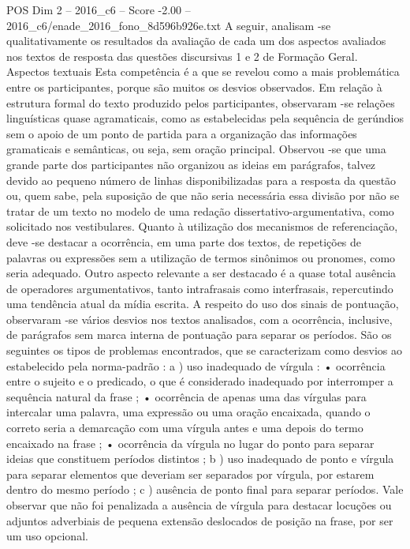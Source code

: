 \begin{textsample}{POS Dim 2 – 2016\_c6 – Score -2.00 – 2016\_c6/enade\_2016\_fono\_8d596b926e.txt}
A seguir, analisam -se qualitativamente os resultados da avaliação de cada um dos aspectos avaliados nos textos de resposta das questões discursivas 1 e 2 de Formação Geral.
Aspectos textuais Esta competência é a que se revelou como a mais problemática entre os participantes, porque são muitos os desvios observados.
Em relação à estrutura formal do texto produzido pelos participantes, observaram -se relações linguísticas quase agramaticais, como as estabelecidas pela sequência de gerúndios sem o apoio de um ponto de partida para a organização das informações gramaticais e semânticas, ou seja, sem oração principal.
Observou -se que uma grande parte dos participantes não organizou as ideias em parágrafos, talvez devido ao pequeno número de linhas disponibilizadas para a resposta da questão ou, quem sabe, pela suposição de que não seria necessária essa divisão por não se tratar de um texto no modelo de uma redação dissertativo-argumentativa, como solicitado nos vestibulares.
Quanto à utilização dos mecanismos de referenciação, deve -se destacar a ocorrência, em uma parte dos textos, de repetições de palavras ou expressões sem a utilização de termos sinônimos ou pronomes, como seria adequado.
Outro aspecto relevante a ser destacado é a quase total ausência de operadores argumentativos, tanto intrafrasais como interfrasais, repercutindo uma tendência atual da mídia escrita.
A respeito do uso dos sinais de pontuação, observaram -se vários desvios nos textos analisados, com a ocorrência, inclusive, de parágrafos sem marca interna de pontuação para separar os períodos.
São os seguintes os tipos de problemas encontrados, que se caracterizam como desvios ao estabelecido pela norma-padrão : a ) uso inadequado de vírgula : • ocorrência entre o sujeito e o predicado, o que é considerado inadequado por interromper a sequência natural da frase ; • ocorrência de apenas uma das vírgulas para intercalar uma palavra, uma expressão ou uma oração encaixada, quando o correto seria a demarcação com uma vírgula antes e uma depois do termo encaixado na frase ; • ocorrência da vírgula no lugar do ponto para separar ideias que constituem períodos distintos ; b ) uso inadequado de ponto e vírgula para separar elementos que deveriam ser separados por vírgula, por estarem dentro do mesmo período ; c ) ausência de ponto final para separar períodos.
Vale observar que não foi penalizada a ausência de vírgula para destacar locuções ou adjuntos adverbiais de pequena extensão deslocados de posição na frase, por ser um uso opcional.

\end{textsample}

